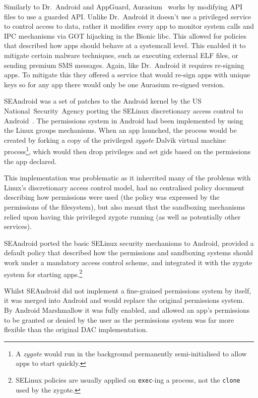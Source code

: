 \documentclass[thesis.tex]{subfiles}
\begin{document}
Similarly to Dr{.}~Android and AppGuard, Aurasium~\cite{xu_aurasium:_2012} works by
modifying API files to use a guarded API.  Unlike Dr{.}~Android it
doesn't use a privileged service to control access to data, rather it
modifies every app to monitor system calls and IPC mechanisms via GOT
hijacking in the Bionic libc.  This allowed for policies that
described how apps should behave at a systemcall level.  This enabled
it to mitigate certain malware techniques, such as executing external
ELF files, or sending premium SMS messages.  Again, like Dr{.}~Android
it requires re-signing apps.  To mitigate this they offered a service
that would re-sign apps with unique keys so for any app there would
only be one Aurasium re-signed version.

SEAndroid was a set of patches to the Android kernel by the US
National~Security~Agency porting the SELinux discretionary access
control to Android~\cite{smalley_security_2013}.  The permissions
system in Android had been implemented by using the Linux groups
mechanisms.  When an app launched, the process would be created by
forking a copy of the privileged \emph{zygote} Dalvik virtual machine
process\footnote{A \emph{zygote} would run in the background permanently
semi-initialised to allow apps to start quickly.}, which would then
drop privileges and set gids based on the permissions the app declared.

This implementation was problematic as it inherrited many of the
problems with Linux's discretionary access control model, had no
centralised policy document describing how permissions were used (the
policy was expressed by the permissions of the filesystem), but also
meant that the sandboxing mechanisms relied upon having this
privileged zygote running (as well as potentially other services).

SEAndroid ported the basic SELinux security mechanisms to Android,
provided a default policy that described how the permissions and
sandboxing systems should work under a mandatory access control
scheme, and integrated it with the zygote system for starting
apps.\footnote{SELinux policies are usually applied on
\texttt{exec}-ing a process, not the \texttt{clone} used by the
zygote.}

Whilst SEAndroid did not implement a fine-grained permissions system
by itself, it was merged into Android and would replace the original
permissions system.  By Android Marshmallow it was fully enabled, and
allowed an app's permissions to be granted or denied by the user as
the permissions system was far more flexible than the original DAC
implementation.
\end{document}
